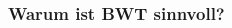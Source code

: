 \documentclass{beamer}
\begin{document}
\begin{frame}
\begin{minipage}[t]{0.48\linewidth}
    \end{minipage}
\end{frame}

\begin{frame}
    \frametitle{Warum ist BWT sinnvoll?}
    \begin{columns}[T]
        \begin{column}{.33\textwidth}
            \centering

\end{column}
\end{columns}
\end{frame}
\end{document}
